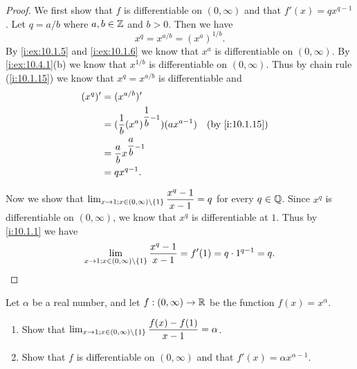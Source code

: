 \begin{proof}
  We first show that \(f\) is differentiable on \((0, \infty)\) and that \(f'(x) = q x^{q - 1}\).
  Let \(q = a / b\) where \(a, b \in \mathbb{Z}\) and \(b > 0\).
  Then we have
  \[
    x^q = x^{a / b} = (x^a)^{1 / b}.
  \]
  By \cref{i:ex:10.1.5} and \cref{i:ex:10.1.6} we know that \(x^a\) is differentiable on \((0, \infty)\).
  By \cref{i:ex:10.4.1}(b) we know that \(x^{1 / b}\) is differentiable on \((0, \infty)\).
  Thus by chain rule (\cref{i:10.1.15}) we know that \(x^q = x^{a / b}\) is differentiable and
  \begin{align*}
    (x^q)' & = (x^{a / b})'                                                              \\
           & = (\dfrac{1}{b} (x^a)^{\dfrac{1}{b} - 1}) (a x^{a - 1}) &  & \by{i:10.1.15} \\
           & = \dfrac{a}{b} x^{\dfrac{a}{b} - 1}                                         \\
           & = q x^{q - 1}.
  \end{align*}

  Now we show that \(\lim_{x \to 1 ; x \in (0, \infty) \setminus \left\lbrace1\right\rbrace} \dfrac{x^q - 1}{x - 1} = q\) for every \(q \in \mathbb{Q}\).
  Since \(x^q\) is differentiable on \((0, \infty)\), we know that \(x^q\) is differentiable at \(1\).
  Thus by \cref{i:10.1.1} we have
  \[
    \lim_{x \to 1 ; x \in (0, \infty) \setminus \left\lbrace1\right\rbrace} \dfrac{x^q - 1}{x - 1} = f'(1) = q \cdot 1^{q - 1} = q.
  \]
\end{proof}

\begin{ex}\label{i:ex:10.4.3}
  Let \(\alpha\) be a real number, and let \(f : (0, \infty) \to \mathbb{R}\) be the function \(f(x) = x^{\alpha}\).
  \begin{enumerate}
    \item Show that \(\lim_{x \to 1 ; x \in (0, \infty) \setminus \left\lbrace1\right\rbrace} \dfrac{f(x) - f(1)}{x - 1} = \alpha\).
    \item Show that \(f\) is differentiable on \((0, \infty)\) and that \(f'(x) = \alpha x^{\alpha - 1}\).
  \end{enumerate}
\end{ex}

